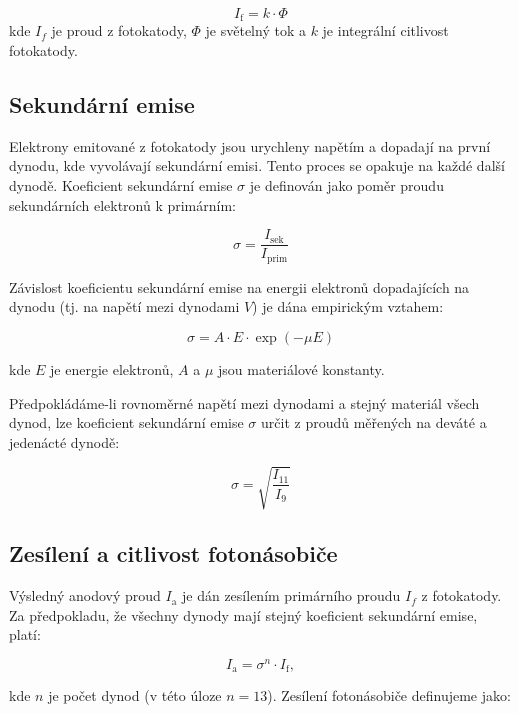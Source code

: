 \documentclass[czech,11pt,a4paper]{article}
\begin{document}
\begin{multicols}{2}
		\begin{equation} I_{\text{f}} = k \cdot \Phi \end{equation}
		kde $I_f$ je proud z fotokatody, $\Phi$ je světelný tok a $k$ je integrální citlivost fotokatody.
		
	\subsection{Sekundární emise}
		Elektrony emitované z fotokatody jsou urychleny napětím a dopadají na první dynodu, kde vyvolávají sekundární emisi. Tento proces se opakuje na každé další dynodě. Koeficient sekundární emise $\sigma$ je definován jako poměr proudu sekundárních elektronů k primárním:
		
		\begin{equation} \sigma = \frac{I_{\text{sek}}}{I_{\text{prim}}} \end{equation}
		
		Závislost koeficientu sekundární emise na energii elektronů dopadajících na dynodu (tj. na napětí mezi dynodami $V$) je dána empirickým vztahem:
		
		\begin{equation} \sigma = A \cdot E \cdot \exp(-\mu E) \end{equation}
		
		kde $E$ je energie elektronů, $A$ a $\mu$ jsou materiálové konstanty.
		
		Předpokládáme-li rovnoměrné napětí mezi dynodami a stejný materiál všech dynod, lze koeficient sekundární emise $\sigma$ určit z proudů měřených na deváté a jedenácté dynodě:
		
		\begin{equation} \sigma = \sqrt{\frac{I_{11}}{I_9}} \end{equation}
		
\subsection{Zesílení a citlivost fotonásobiče}
		Výsledný anodový proud $I_\mathrm{a}$	je dán zesílením primárního  proudu $I_f$ z fotokatody. Za předpokladu, že všechny dynody mají stejný koeficient sekundární emise, platí:
		
		\begin{equation} I_{\text{a}} = \sigma^n \cdot I_{\text{f}}, \end{equation}
		
		kde $n$ je počet dynod (v této úloze $n=13$).		
		Zesílení fotonásobiče definujeme jako:
		

\end{multicols}
\end{document}
